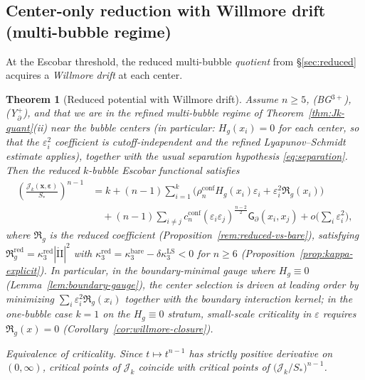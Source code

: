 \documentclass[11pt,reqno,a4paper]{amsart}
\numberwithin{equation}{section}
\theoremstyle{plain}
\newtheorem{theorem}{Theorem}[section]
\theoremstyle{remark}
\theoremstyle{plain}
\begin{document}
\subsection{Center-only reduction with Willmore drift (multi-bubble regime)}
At the Escobar threshold, the reduced multi-bubble \emph{quotient} from \S\ref{sec:reduced}
acquires a \emph{Willmore drift} at each center.

\begin{theorem}[Reduced potential with Willmore drift]\label{thm:drift}
Assume $n\ge5$, \textup{(BG$^{3+}$)}, \textup{(Y$^+_{\partial}$)}, and that we are in the \emph{refined multi-bubble regime}
of Theorem~\ref{thm:Jk-quant}\textup{(ii)} near the bubble centers (in particular: $H_g(x_i)=0$ for each center,
so that the $\varepsilon_i^2$ coefficient is cutoff-independent and the refined Lyapunov--Schmidt estimate applies),
together with the usual separation hypothesis \eqref{eq:separation}.
Then the reduced $k$-bubble Escobar functional satisfies
\begin{align*}
\left(\frac{\mathcal J_k(\mathbf x,\boldsymbol\varepsilon)}{S_\ast}\right)^{n-1}
& = k
+(n-1)\sum_{i=1}^k \big(\rho_n^{\mathrm{conf}}H_g(x_i)\varepsilon_i+\varepsilon_i^2\mathfrak R_g(x_i)\big)
\\&\quad+(n-1)\sum_{i\neq j} c_n^{\mathrm{conf}}(\varepsilon_i\varepsilon_j)^{\frac{n-2}{2}}
\mathsf G_\partial(x_i,x_j)
+o\Big(\sum_{i}\varepsilon_i^2\Big),
\end{align*}
where $\mathfrak R_g$ is the reduced coefficient (Proposition~\ref{rem:reduced-vs-bare}),
satisfying $\mathfrak R_g^{\mathrm{red}}=\kappa_3^{\mathrm{red}}|\mathring{\mathrm{II}}|^2$
with $\kappa_3^{\mathrm{red}}=\kappa_3^{\mathrm{bare}}-\delta\kappa_3^{\mathrm{LS}}<0$ for $n\ge6$
(Proposition~\ref{prop:kappa-explicit}). In particular, in the boundary-minimal gauge where
$H_g\equiv0$ (Lemma~\ref{lem:boundary-gauge}), the center selection is driven at leading order by minimizing
$\sum_i \varepsilon_i^2 \mathfrak{R}_g(x_i)$
together with the boundary interaction kernel; in the one-bubble case $k=1$ on the $H_g\equiv0$ stratum, small-scale criticality in $\varepsilon$
requires $\mathfrak R_g(x)=0$ (Corollary~\ref{cor:willmore-closure}).


\smallskip
\noindent\emph{Equivalence of criticality.} Since $t\mapsto t^{n-1}$ has strictly positive derivative on $(0,\infty)$,
critical points of $\mathcal J_k$ coincide with critical points of $\big(\mathcal J_k/S_\ast\big)^{n-1}$.
\end{theorem}
\end{document}
